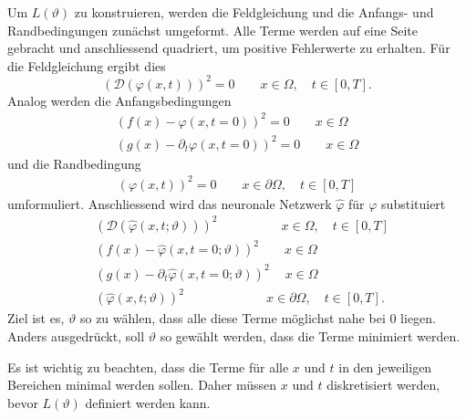 Um \( L(\vartheta) \) zu konstruieren, werden die Feldgleichung und die Anfangs- und Randbedingungen zunächst umgeformt.
Alle Terme werden auf eine Seite gebracht und anschliessend quadriert, um positive Fehlerwerte zu erhalten.
Für die Feldgleichung ergibt dies
\begin{equation}
    \left(\mathcal{D}(\varphi(x, t))\right)^2 = 0 \qquad x \in \Omega, \quad t \in [0,T].
    \label{neuronal:feldgleichung_umformuliert}
\end{equation}
Analog werden die Anfangsbedingungen
\begin{equation}
    \begin{aligned}
        \left(f(x) - \varphi(x, t = 0)\right)^2 = 0 \qquad x \in \Omega\\
        \left(g(x) - \partial_t \varphi(x, t = 0)\right)^2 = 0 \qquad x \in \Omega
    \end{aligned}
    \label{neuronal:anfangsbedingung_umformuliert}
\end{equation}
und die Randbedingung
\begin{equation}
    \begin{aligned}
        \left(\varphi(x, t)\right)^2 = 0 \qquad x \in \partial \Omega, \quad t \in [0,T]
    \end{aligned}
    \label{neuronal:randbedingung_umformuliert}
\end{equation}
umformuliert.
Anschliessend wird das neuronale Netzwerk $\hat{\varphi}$ für $\varphi$ substituiert
\begin{equation}
    \begin{aligned}
        &\left(\mathcal{D}(\hat{\varphi}(x, t; \vartheta))\right)^2 \qquad \qquad \quad x \in \Omega, \quad t \in [0,T]\\
        &\left(f(x) - \hat{\varphi}(x, t = 0; \vartheta)\right)^2 \qquad x \in \Omega\\
        &\left(g(x) - \partial_t \hat{\varphi}(x, t = 0; \vartheta)\right)^2 \quad \: x \in \Omega\\
        &\left(\hat{\varphi}(x, t; \vartheta)\right)^2 \qquad \qquad \qquad \: \: x \in \partial \Omega, \quad t \in [0,T].
    \end{aligned}
    \label{neuronal:umformuliert_nn}
\end{equation}
Ziel ist es, $\vartheta$ so zu wählen, dass alle diese Terme möglichst nahe bei 0 liegen.
Anders ausgedrückt, soll $\vartheta$ so gewählt werden, dass die Terme minimiert werden.

Es ist wichtig zu beachten, dass die Terme für alle $x$ und $t$ in den jeweiligen Bereichen minimal werden sollen.
Daher müssen $x$ und $t$ diskretisiert werden, bevor $L(\vartheta)$ definiert werden kann.

